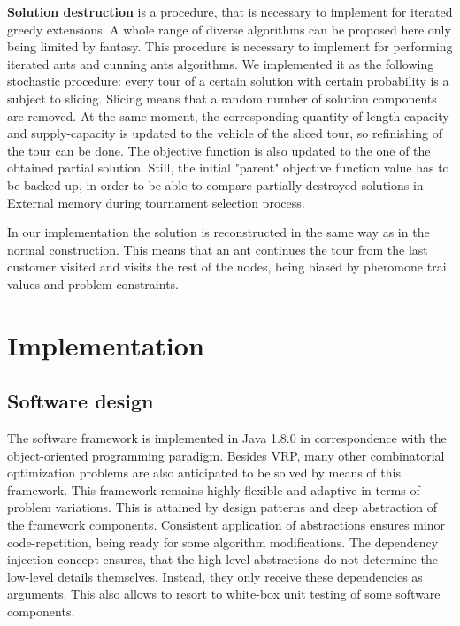 \documentclass[11pt,a4paper,oneside]{book}
\begin{document}
\textbf{Solution destruction} is a procedure, that is necessary to implement for iterated greedy extensions. A whole range of diverse algorithms can be proposed here only being limited by fantasy. This procedure is necessary to implement for performing iterated ants and cunning ants algorithms. We implemented it as the following stochastic procedure: every tour of a certain solution with certain probability is a subject to slicing. Slicing means that a random number of solution components are removed. At the same moment, the corresponding quantity of length-capacity and supply-capacity is updated to the vehicle of the sliced tour, so refinishing of the tour can be done. The objective function is also updated to the one of the obtained partial solution. Still, the initial "parent" objective function value has to be backed-up, in order to be able to compare partially destroyed solutions in External memory during tournament selection process.

In our implementation the solution is reconstructed in the same way as in the normal construction. This means that an ant continues the tour from the last customer visited and visits the rest of the nodes, being biased by pheromone trail values and problem constraints.



\chapter{Implementation}


\section{Software design}

The software framework is implemented in Java 1.8.0 in correspondence with the object-oriented programming paradigm. Besides VRP, many other combinatorial optimization problems are also anticipated to be solved by means of this framework. This framework remains highly flexible and adaptive in terms of problem variations. This is attained by design patterns and deep abstraction of the framework components. Consistent application of abstractions ensures minor code-repetition, being ready for some algorithm modifications. The dependency injection concept ensures, that the high-level abstractions do not determine the low-level details themselves. Instead, they only receive these dependencies as arguments. This also allows to resort to white-box unit testing of some software components.
\end{document}
